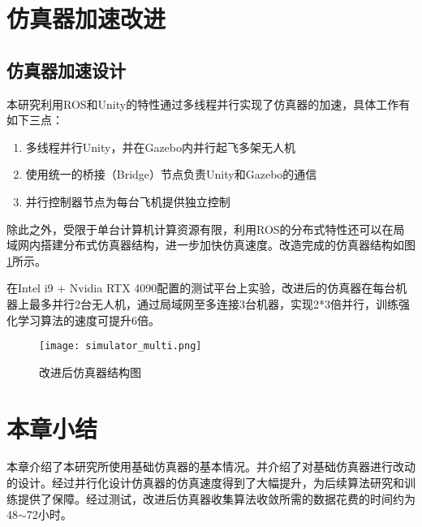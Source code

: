 \section{仿真器加速改进}
\subsection{仿真器加速设计}
本研究利用ROS和Unity的特性通过多线程并行实现了仿真器的加速，具体工作有如下三点：
\begin{enumerate}
  \item 多线程并行Unity，并在Gazebo内并行起飞多架无人机
  \item 使用统一的桥接（Bridge）节点负责Unity和Gazebo的通信
  \item 并行控制器节点为每台飞机提供独立控制
\end{enumerate}

除此之外，受限于单台计算机计算资源有限，利用ROS的分布式特性还可以在局域网内搭建分布式仿真器结构，进一步加快仿真速度。改造完成的仿真器结构如图\ref{fig_simulator_multi}所示。

在Intel i9 + Nvidia RTX 4090配置的测试平台上实验，改进后的仿真器在每台机器上最多并行2台无人机，通过局域网至多连接3台机器，实现2*3倍并行，训练强化学习算法的速度可提升6倍。
\begin{figure}
  \centering
  \texttt{[image: simulator\_multi.png]}
  \caption{改进后仿真器结构图}
  \label{fig_simulator_multi}
\end{figure}

\section{本章小结}

本章介绍了本研究所使用基础仿真器的基本情况。并介绍了对基础仿真器进行改动的设计。经过并行化设计仿真器的仿真速度得到了大幅提升，为后续算法研究和训练提供了保障。经过测试，改进后仿真器收集算法收敛所需的数据花费的时间约为48$\sim$72小时。





